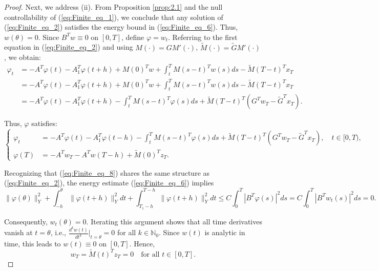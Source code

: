 \documentclass[10pt,a4paper]{amsart}
\begin{document}
\begin{proof}
Next, we address (ii). From Proposition \ref{prop:2.1} and the null controllability of (\ref{eq:Finite_eq_1}), we conclude that any solution of (\ref{eq:Finite_eq_2}) satisfies the energy bound in (\ref{eq:Finite_eq_6}). Thus, \( w(\theta) = 0 \). Since \( B^T w \equiv 0 \) on \( [0,T] \), define \( \varphi = w_t \). Referring to the first equation in (\ref{eq:Finite_eq_2}) and using \( M(\cdot) = G M'(\cdot) \), \( \widetilde{M}(\cdot) = \widetilde{G} M'(\cdot) \), we obtain:
\begin{align*}
\varphi_t &= -A^T \varphi(t)-A_1^T \varphi(t+h) + M(0)^T w + \int_t^T M(s - t)^T w(s)ds - \widetilde{M}(T - t)^T x_T \\
&= -A^T \varphi (t)-A_1^T \varphi(t+h) + M(0)^T w + \int_t^T M(s - t)^T w(s)ds - \widetilde{M}(T - t)^T x_T \\
&= -A^T \varphi(t)-A_1^T \varphi(t+h) - \int_t^T M(s - t)^T \varphi(s)ds + \widetilde{M}(T - t)^T (G^T w_T - \widetilde{G}^T x_T).
\end{align*}

Thus, \( \varphi \) satisfies:
\begin{equation}
\label{eq:Finite_eq_8}
\left\{
\begin{aligned}
\varphi_t &= -A^T \varphi(t)-A_1^T \varphi(t-h) - \int_t^T M(s - t)^T \varphi(s)ds + \widetilde{M}(T - t)^T (G^T w_T - \widetilde{G}^T x_T), \quad t \in [0, T), \\
\varphi(T) &= -A^T w_T-A^T w(T-h) + \widetilde{M}(0)^T z_T.
\end{aligned}
\right.
\end{equation}

Recognizing that (\ref{eq:Finite_eq_8}) shares the same structure as (\ref{eq:Finite_eq_2}), the energy estimate (\ref{eq:Finite_eq_6}) implies
\begin{equation}
\label{eq:Finite_eq_9}
 \|\varphi(\theta)\|_Y^2 + \int_{ - h}^{\theta} \|\varphi(t+h)\|_Y^2 dt+ \int_{T_1 - h}^{T-h} \|\varphi(t+h)\|_Y^2 dt \leq C \int_0^T |B^T \varphi(s)|^2 ds = C \int_0^T |B^T w_t(s)|^2 ds = 0.
\end{equation}

Consequently, \( w_t(\theta) = 0 \). Iterating this argument shows that all time derivatives vanish at \( t = \theta \), i.e., \( \frac{d^k w(t)}{dt^k}\big|_{t=\theta} = 0 \) for all \( k \in \mathbb{N}_0 \). Since \( w(t) \) is analytic in time, this leads to \( w(t) \equiv 0 \) on \( [0,T] \). Hence,
\[
w_T = \widetilde{M}(t)^T z_T = 0 \quad \text{for all } t \in [0, T].
\]
\end{proof}
\end{document}
